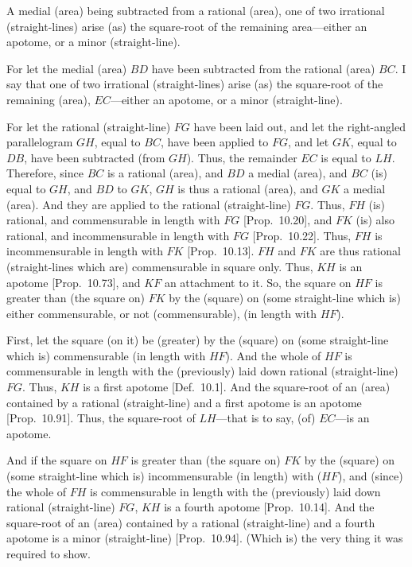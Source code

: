 \begin{Parallel}{}{}
{A
medial (area) being subtracted from a rational (area), one of two irrational (straight-lines)
arise (as) the square-root of the remaining area---either an apotome, or a minor (straight-line).

\epsfysize=1.5in
\centerline{}

For let the medial (area) $BD$ have been subtracted from the
rational (area) $BC$. I say that  one of two irrational (straight-lines) arise
(as) the square-root of the
remaining (area), $EC$---either
an apotome, or a minor (straight-line).

For let the rational (straight-line) $FG$ have been laid out,
and let the right-angled parallelogram $GH$, equal to $BC$, have
been applied to $FG$, and let $GK$, equal to $DB$, have
been subtracted (from $GH$).  Thus, the remainder $EC$
is equal to $LH$. Therefore, since $BC$
is a rational (area), and $BD$ a medial (area), and $BC$
(is) equal to $GH$, and $BD$ to $GK$, $GH$ is thus a rational (area),
and $GK$ a medial (area). And they are applied to the rational (straight-line)
$FG$. Thus, $FH$ (is) rational, and commensurable in length with $FG$
[Prop.~10.20], and $FK$ (is) also rational, and
incommensurable in length with $FG$ [Prop.~10.22]. Thus, $FH$ is incommensurable
in length with $FK$ [Prop.~10.13]. 
$FH$ and $FK$ are thus rational (straight-lines which are) commensurable
in square only. Thus, $KH$ is an apotome [Prop.~10.73], and $KF$ an attachment to it.
So, the square on $HF$ is  greater than (the square on) $FK$ by
the (square) on (some straight-line which is) either commensurable,
or not (commensurable), (in length with $HF$).

First, let the square (on it) be (greater) by the (square) on  (some straight-line
which is) commensurable
(in length with $HF$). And the whole of $HF$ is commensurable
in length with the (previously) laid down rational (straight-line) $FG$. 
Thus, $KH$ is a first apotome [Def.~10.1]. And
the square-root of an (area) contained by a rational (straight-line)
and a first apotome is an apotome [Prop.~10.91]. 
Thus, the square-root of $LH$---that is to say, (of) $EC$---is an apotome.

And if the square on  $HF$ is greater than (the square on) $FK$ by the
(square) on (some straight-line which is) incommensurable (in length) with ($HF$),
and (since) the whole of $FH$ is commensurable in length with
the (previously) laid down rational (straight-line) $FG$, $KH$ is a fourth
apotome [Prop.~10.14]. And the square-root
of an (area) contained by a rational (straight-line) and a fourth apotome
is a minor (straight-line)
[Prop.~10.94]. (Which is) the very thing it was required to show.}
\end{Parallel}

